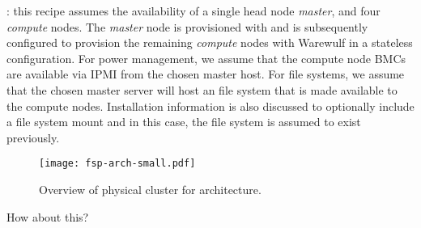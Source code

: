 : this recipe assumes the availability of a single head node
{\em master}, and four {\em compute} nodes. The {\em master} node is
provisioned with \baseOS{} and is subsequently configured to provision the
remaining {\em compute} nodes with Warewulf in a stateless configuration. For
power management, we assume that the compute node BMCs are available via IPMI
from the chosen master host. For file systems, we assume that the chosen master
server will host an \NFS{} file system that is made available to the compute
nodes. Installation information is also discussed to optionally include
a \Lustre{} file system mount and in this case, the \Lustre{} file system is
assumed to exist previously.

\begin{figure}[hb]
\center
\texttt{[image: fsp-arch-small.pdf]}
\vspace*{-0.1cm}
\caption{Overview of physical cluster for architecture.}
\end{figure}


How about this?
